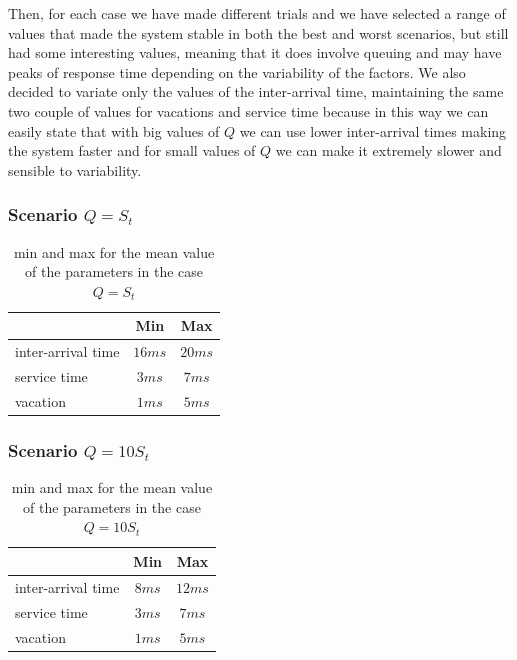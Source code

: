 \documentclass{article}
\begin{document}
        Then, for each case we have made different trials and we have selected a range of values that made the system stable in both the best and worst scenarios, but still had some interesting values, meaning that it does involve queuing and may have peaks of response time depending on the variability of the factors.
        We also decided to variate only the values of the inter-arrival time, maintaining the same two couple of values for vacations and service time because in this way we can easily state that with big values of $Q$ we can use lower inter-arrival times making the system faster and for small values of $Q$ we can make it extremely slower and sensible to variability. 
        
        \subsubsection{Scenario $Q = S_t$}
        
            \begin{table}[htbp!]
                \centering 
                \begin{tabular}{|l|c|c|}
                    \hline
                    \ & Min & Max \\
                    \hline
                    inter-arrival time & $16ms$ & $20ms$ \\
                    \hline
                    service time & $3ms$ & $7ms$ \\
                    \hline
                    vacation & $1ms$ & $5ms$ \\
                    \hline
                \end{tabular}
                \caption{min and max for the mean value of the parameters in the case $Q = S_t$} 
            \end{table}
            
        \subsubsection{Scenario $Q = 10S_t$}
        
            \begin{table}[htbp!]
                \centering 
                \begin{tabular}{|l|c|c|}
                    \hline
                    \ & Min & Max \\
                    \hline
                    inter-arrival time & $8ms$ & $12ms$ \\
                    \hline
                    service time & $3ms$ & $7ms$ \\
                    \hline
                    vacation & $1ms$ & $5ms$ \\
                    \hline
                \end{tabular}
                \caption{min and max for the mean value of the parameters in the case $Q = 10S_t$} 
            \end{table}
        
\end{document}
